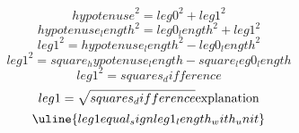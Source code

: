 \[ {hypotenuse}^{2}={leg0}^{2}+{leg1}^{2} \]
\[ {hypotenuse_length}^{2}={leg0_length}^{2}+{leg1}^{2} \]
\[ {leg1}^{2}={hypotenuse_length}^{2}-{leg0_length}^{2} \]
\[ {leg1}^{2}={square_hypotenuse_length}-{square_leg0_length} \]
\[ {leg1}^{2}={squares_difference} \]
\[ {leg1}=\sqrt{\mathstrut {squares_difference}}\text{{explanation}}\]
\[ \uline{{leg1}{equal_sign}{leg1_length_with_unit}}\]